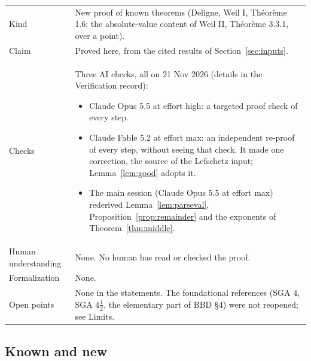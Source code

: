 \documentclass[11pt,a4paper]{article}
\theoremstyle{plain}
\theoremstyle{definition}
\theoremstyle{remark}
\begin{document}
\noindent
\begin{tabularx}{\textwidth}{@{}L{3.2cm}Y@{}}
\toprule
Kind & New proof of known theorems (Deligne, Weil I, Th\'eor\`eme 1.6; the absolute-value content of Weil II, Th\'eor\`eme
3.3.1, over a point).\\
Claim & Proved here, from the cited results of Section~\ref{sec:inputs}.\\
Checks & Three AI checks, all on 21 Nov 2026 (details in the Verification record):
\begin{itemize}[leftmargin=*,nosep]
\item Claude Opus 5.5 at effort high: a targeted proof check of every step.
\item Claude Fable 5.2 at effort max: an independent re-proof of every step, without seeing that check. It made one
correction, the source of the Lefschetz input; Lemma~\ref{lem:good} adopts it.
\item The main session (Claude Opus 5.5 at effort max) rederived Lemma~\ref{lem:parseval},
Proposition~\ref{prop:remainder} and the exponents of Theorem~\ref{thm:middle}.
\end{itemize}\\
Human understanding & None. No human has read or checked the proof.\\
Formalization & None.\\
Open points & None in the statements. The foundational references (SGA 4, SGA $4\frac12$, the elementary part of BBD
\S4) were not reopened; see Limits.\\
\bottomrule
\end{tabularx}

\subsection{Known and new}
\end{document}

